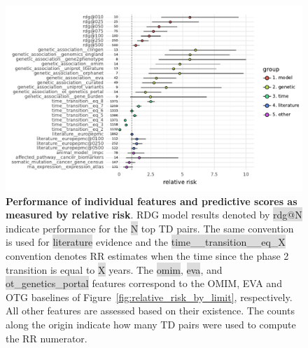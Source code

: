 \documentclass{article}
\begin{document}
\begin{figure}[H]
  \centering
  \captionsetup{width=.9\linewidth}
  \includegraphics[width=1\textwidth]{relative_risk_core_features.pdf}
  \caption{
    \textbf{Performance of individual features and predictive scores as measured by relative risk}.
    RDG model results denoted by \colorbox{Gainsboro}{rdg@N} indicate performance for the \colorbox{Gainsboro}{N} top TD pairs. The same convention is used for \colorbox{Gainsboro}{literature} evidence and the \colorbox{Gainsboro}{time\_\_transition\_\_eq\_X} convention denotes RR estimates when the time since the phase 2 transition is equal to \colorbox{Gainsboro}{X} years. The \colorbox{Gainsboro}{omim}, \colorbox{Gainsboro}{eva}, and \colorbox{Gainsboro}{ot\_genetics\_portal} features correspond to the OMIM, EVA and OTG baselines of Figure~\ref{fig:relative_risk_by_limit}, respectively. All other features are assessed based on their existence. The counts along the origin indicate how many TD pairs were used to compute the RR numerator.
  }
  \label{fig:relative_risk_core_features}
\end{figure}
\end{document}
